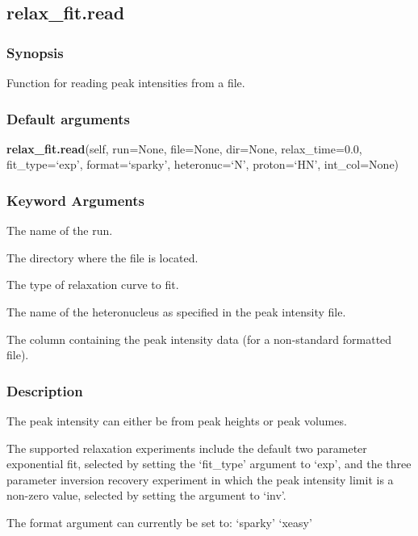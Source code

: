 \newpage

\subsection{relax\_fit.read}


\subsubsection{Synopsis}

Function for reading peak intensities from a file.

\subsubsection{Default arguments}

\textsf{\textbf{relax\_fit.read}(self, run=None, file=None, dir=None, relax\_time=0.0, fit\_type=`exp', format=`sparky', heteronuc=`N', proton=`HN', int\_col=None)}


\subsubsection{Keyword Arguments}

  The name of the run.

  The directory where the file is located.

  The type of relaxation curve to fit.

  The name of the heteronucleus as specified in the peak intensity file.

  The column containing the peak intensity data (for a non-standard formatted file).

\subsubsection{Description}

The peak intensity can either be from peak heights or peak volumes.


The supported relaxation experiments include the default two parameter exponential fit,
selected by setting the `fit\_type' argument to `exp', and the three parameter inversion
recovery experiment in which the peak intensity limit is a non-zero value, selected by
setting the argument to `inv'.


The format argument can currently be set to:
    `sparky'
    `xeasy'

